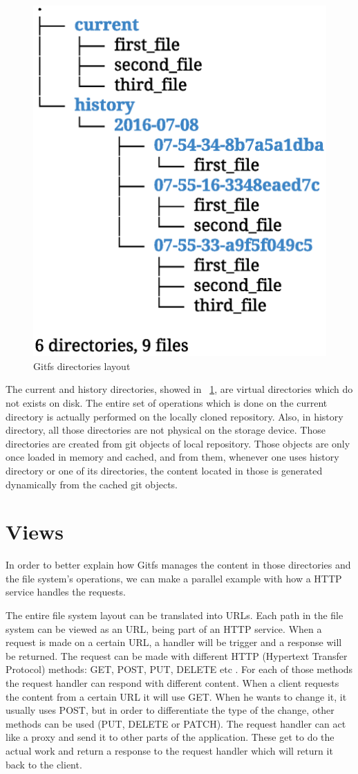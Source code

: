 \begin{figure}[h]
  \begin{center}
    \def\svgwidth{\columnwidth}
    \includegraphics[width=.5\textwidth]{layout/layout}
    \caption{\label{fig:gitfslayout} Gitfs directories layout}
  \end{center}
\end{figure}

The current and history directories, showed in ~\ref{fig:gitfslayout}, are virtual directories which do not exists on disk. The entire set of operations which is done on the current directory is actually performed on the locally cloned repository. Also, in history directory, all those directories are not physical on the storage device. Those directories are created from git objects of local repository. Those objects are only once loaded in memory and cached, and from them, whenever one uses history directory or one of its directories, the content located in those is generated dynamically from the cached git objects.

\section{Views}
In order to better explain how Gitfs manages the content in those directories and the file system's operations, we can make a parallel example with how a HTTP service handles the requests.

The entire file system layout can be translated into URLs. Each path in the file system can be viewed as an URL, being part of an HTTP service. When a request is made on a certain URL, a handler will be trigger and a response will be returned. The request can be made with different HTTP (Hypertext Transfer Protocol) methods: GET, POST, PUT, DELETE etc \cite{Fielding1999}. For each of those methods the request handler can respond with different content. When a client requests the content from a certain URL it will use GET. When he wants to change it, it usually uses POST, but in order to differentiate the type of the change, other methods can be used (PUT, DELETE or PATCH). The request handler can act like a proxy and send it to other parts of the application. These get to do the actual work and return a response to the request handler which will return it back to the client.

